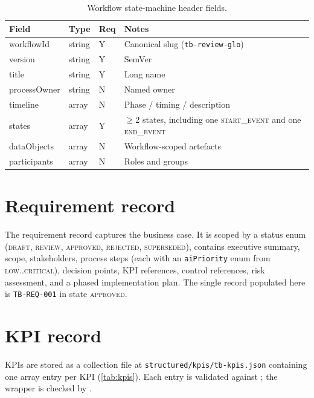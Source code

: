 \documentclass[11pt,a4paper,twoside]{report}
\newcommand{\corpus}{}
\begin{document}
\begin{table}[htbp]
\caption{Workflow state-machine header fields.}\label{tab:workflow-fields}
\centering
\small
\begin{tabularx}{\linewidth}{@{}lllX@{}}
\toprule
\textbf{Field} & \textbf{Type} & \textbf{Req} & \textbf{Notes} \\ \midrule
workflowId    & string & Y & Canonical slug (\texttt{tb-review-glo}) \\
version       & string & Y & SemVer \\
title         & string & Y & Long name \\
processOwner  & string & N & Named owner \\
timeline      & array  & N & Phase / timing / description \\
states        & array  & Y & $\ge 2$ states, including one \textsc{start\_event} and one \textsc{end\_event} \\
dataObjects   & array  & N & Workflow-scoped artefacts \\
participants  & array  & N & Roles and groups \\
\bottomrule
\end{tabularx}
\end{table}

\section{Requirement record}\label{sec:requirement-schema}

The requirement record captures the business case. It is scoped by a
status enum (\textsc{draft}, \textsc{review}, \textsc{approved},
\textsc{rejected}, \textsc{superseded}), contains executive summary,
scope, stakeholders, process steps (each with an \texttt{aiPriority}
enum from \textsc{low}..\textsc{critical}), decision points, KPI
references, control references, risk assessment, and a phased
implementation plan. The single record populated here is
\texttt{TB-REQ-001} in state \textsc{approved}.

\section{KPI record}\label{sec:kpi-schema}

KPIs are stored as a collection file at
\corpus\texttt{structured/kpis/tb-kpis.json} containing one array
entry per KPI (\cref{tab:kpis}). Each entry is validated against
; the wrapper is checked by
.
\end{document}
